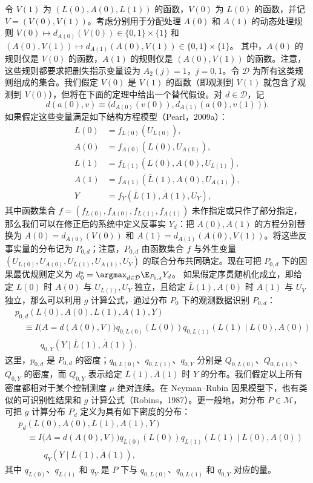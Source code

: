 令 $V(1)$ 为 $(L(0),A(0),L(1))$ 的函数，$V(0)$ 为 $L(0)$ 的函数，并记 $V=(V(0),V(1))$。考虑分别用于分配处理 $A(0)$ 和 $A(1)$ 的动态处理规则
$V(0)\mapsto d_{A(0)}(V(0))\in\{0,1\}\times\{1\}$ 和
$(A(0),V(1))\mapsto d_{A(1)}(A(0),V(1))\in\{0,1\}\times\{1\}$。
其中，$A(0)$ 的规则仅是 $V(0)$ 的函数，$A(1)$ 的规则仅是 $(A(0),V(1))$ 的函数。注意，这些规则都要求把删失指示变量设为 $A_2(j)=1$，$j=0,1$。令 $\mathcal D$ 为所有这类规则组成的集合。我们假定 $V(0)$ 是 $V(1)$ 的函数（即观测到 $V(1)$ 就包含了观测到 $V(0)$），但将在下面的定理中给出一个替代假设。对 $d\in\mathcal D$，记
\[
 d(a(0),v)\equiv\bigl(d_{A(0)}(v(0)),d_{A(1)}(a(0),v(1))\bigr).
\]
如果假定这些变量满足如下结构方程模型（Pearl，2009a）：
\[
\begin{aligned}
 L(0)&=f_{L(0)}(U_{L(0)}),\\
 A(0)&=f_{A(0)}(L(0),U_{A(0)}),\\
 L(1)&=f_{L(1)}(L(0),A(0),U_{L(1)}),\\
 A(1)&=f_{A(1)}(\bar L(1),A(0),U_{A(1)}),\\
 Y&=f_Y(\bar L(1),\bar A(1),U_Y),
\end{aligned}
\]
其中函数集合 $f=(f_{L(0)},f_{A(0)},f_{L(1)},f_{A(1)})$ 未作指定或只作了部分指定，那么我们可以在修正后的系统中定义反事实 $Y_d$：把 $A(0),A(1)$ 的方程分别替换为 $A(0)=d_{A(0)}(V(0))$ 和 $A(1)=d_{A(1)}(A(0),V(1))$。将这些反事实量的分布记为 $P_{0,d}$；注意，$P_{0,d}$ 由函数集合 $f$ 与外生变量 $(U_{L(0)},U_{A(0)},U_{L(1)},U_{A(1)},U_Y)$ 的联合分布共同确定。现在可把 $P_{0,d}$ 下的因果最优规则定义为
$d_0^*=\argmax_{d\in\mathcal D}\E_{P_{0,d}}Y_d$。
如果假定序贯随机化成立，即给定 $L(0)$ 时 $A(0)$ 与 $U_{L(1)},U_Y$ 独立，且给定 $\bar L(1),A(0)$ 时 $A(1)$ 与 $U_Y$ 独立，那么可以利用 $g$ 计算公式，通过分布 $P_0$ 下的观测数据识别 $P_{0,d}$：
\begin{equation}
\begin{aligned}
 &p_{0,d}(L(0),A(0),L(1),A(1),Y)\\
 &\quad\equiv I\bigl(A=d(A(0),V)\bigr)q_{0,L(0)}(L(0))
 q_{0,L(1)}(L(1)\mid L(0),A(0))\\
 &\qquad\quad q_{0,Y}(Y\mid\bar L(1),\bar A(1)).
\end{aligned}
\tag{22.1}
\end{equation}
这里，$p_{0,d}$ 是 $P_{0,d}$ 的密度；$q_{0,L(0)}$、$q_{0,L(1)}$、$q_{0,Y}$ 分别是 $Q_{0,L(0)}$、$Q_{0,L(1)}$、$Q_{0,Y}$ 的密度，而 $Q_{0,Y}$ 表示给定 $\bar L(1),\bar A(1)$ 时 $Y$ 的分布。我们假定以上所有密度都相对于某个控制测度 $\mu$ 绝对连续。在 Neyman--Rubin 因果模型下，也有类似的可识别性结果和 $g$ 计算公式（Robins，1987）。更一般地，对分布 $P\in\mathcal M$，可把 $g$ 计算分布 $P_d$ 定义为具有如下密度的分布：
\[
\begin{aligned}
 &p_d(L(0),A(0),L(1),A(1),Y)\\
 &\quad\equiv I\bigl(A=d(A(0),V)\bigr)q_{L(0)}(L(0))
 q_{L(1)}(L(1)\mid L(0),A(0))\\
 &\qquad\quad q_Y(Y\mid\bar L(1),\bar A(1)),
\end{aligned}
\]
其中 $q_{L(0)}$、$q_{L(1)}$ 和 $q_Y$ 是 $P$ 下与 $q_{0,L(0)}$、$q_{0,L(1)}$ 和 $q_{0,Y}$ 对应的量。


